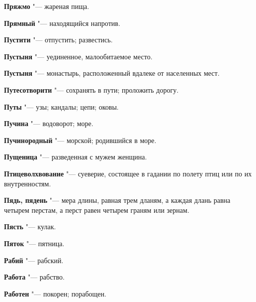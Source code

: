 \begin{mymulticols}{2}
\noindent\textbf{Пряжмо} "--- жареная пища. 




\noindent\textbf{Прямный} "--- находящийся напротив. 




\noindent\textbf{Пустити} "--- отпустить; развестись. 




\noindent\textbf{Пустыня} "--- уединенное, малообитаемое место. 




\noindent\textbf{Пустыня} "--- монастырь, расположенный вдалеке от населенных мест. 




\noindent\textbf{Путесотворити} "--- сохранять в пути; проложить дорогу. 




\noindent\textbf{Путы} "--- узы; кандалы; цепи; оковы. 




\noindent\textbf{Пучина} "--- водоворот; море. 




\noindent\textbf{Пучинородный} "--- морской; родившийся в море. 




\noindent\textbf{Пущеница} "--- разведенная с мужем женщина. 




\noindent\textbf{Птицеволхвование} "--- суеверие, состоящее в гадании по полету птиц или по их внутренностям. 




\noindent\textbf{Пядь, пядень} "--- мера длины, равная трем дланям, а каждая длань равна четырем перстам, а перст равен четырем граням или зернам. 




\noindent\textbf{Пясть} "--- кулак. 




\noindent\textbf{Пяток} "--- пятница. 




\bukvaending






\noindent\textbf{Рабий} "--- рабский. 




\noindent\textbf{Работа} "--- рабство. 




\noindent\textbf{Работен} "--- покорен; порабощен. 





\end{mymulticols}
